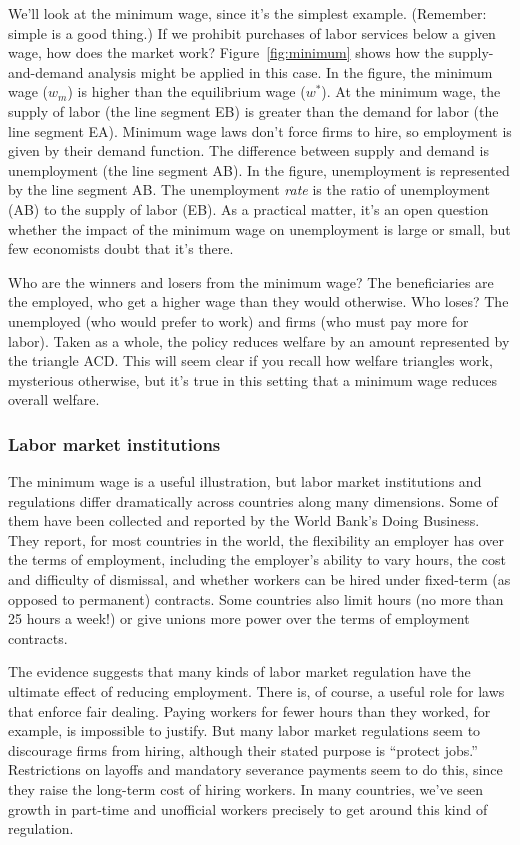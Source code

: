 \documentclass[letterpaper,12pt]{article}
\begin{document}
We'll look at the minimum wage, since it's the simplest example.
(Remember:  simple is a good thing.)
If we prohibit purchases of labor services below a given wage,
how does the market work?
Figure~\ref{fig:minimum} shows how the supply-and-demand analysis
might be applied in this case.  In the figure, the minimum wage
($w_{m}$) is higher than the equilibrium wage ($w^{*}$).
At the minimum wage, the supply of labor
(the line segment EB) is greater than the demand for labor
(the line segment EA).
Minimum wage laws don't force firms to hire,
so employment is given by their demand function.
The difference between supply and demand is
unemployment (the line segment AB).
In the figure, unemployment is represented by the line segment AB.
The unemployment {\it rate\/} is the ratio of unemployment (AB)
to the supply of labor (EB).
As a practical matter, it's an open question whether the impact of the
minimum wage on unemployment is large or small, but few economists
doubt that it's there.


Who are the winners and losers from the minimum wage?
The beneficiaries are the employed,
who get a higher wage than they would otherwise.
Who loses?  The unemployed (who would prefer to work)
and firms (who must pay more for labor).
Taken as a whole, the policy reduces welfare by an amount
represented by the triangle ACD.
This will seem clear if you recall how welfare triangles work,
mysterious otherwise,
but it's true in this setting that a minimum wage reduces overall welfare.

\subsubsection*{Labor market institutions}

The minimum wage is a useful illustration,
but labor market institutions and regulations
differ dramatically across countries along many dimensions.
Some of them have been collected and reported by the
World Bank's Doing Business.
They report, for most countries in the world,
the flexibility an employer has over the terms of employment,
including the employer's ability to vary hours,
the cost and difficulty of dismissal,
and whether workers can be hired under fixed-term (as opposed to permanent)
contracts.
Some countries also limit hours (no more than 25 hours a week!) 
or give unions more power over the terms of employment contracts.


The evidence suggests that many kinds of labor market regulation
have the ultimate effect of reducing employment.
There is, of course, a useful role for laws that enforce fair dealing.
Paying workers for fewer hours than they worked,
for example, is impossible to justify.
But many labor market regulations seem to discourage firms from hiring,
although their stated purpose is ``protect jobs.''
Restrictions on layoffs and mandatory severance payments
seem to do this, since they raise the long-term cost
of hiring workers.
In many countries, we've seen growth in part-time and unofficial
workers precisely to get around this kind of regulation.
\end{document}
